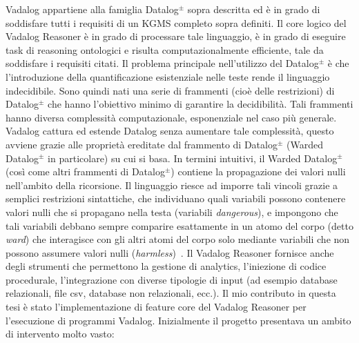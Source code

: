 Vadalog appartiene alla famiglia Datalog$^\pm$ sopra descritta ed è in grado di soddisfare tutti i requisiti di un KGMS completo sopra definiti. \newline
Il core logico del Vadalog Reasoner è in grado di processare tale linguaggio, è in grado di eseguire task di reasoning ontologici e risulta computazionalmente efficiente, tale da soddisfare i requisiti citati. \newline
Il problema principale nell'utilizzo del Datalog$^\pm$ è che l'introduzione della quantificazione esistenziale nelle teste rende il linguaggio indecidibile. Sono quindi nati una serie di frammenti (cioè delle restrizioni) di Datalog$^\pm$ che hanno l'obiettivo minimo di garantire la decidibilità. Tali frammenti hanno diversa complessità computazionale, esponenziale nel caso più generale. \newline
Vadalog cattura ed estende Datalog senza aumentare tale complessità, questo avviene grazie alle proprietà ereditate dal frammento di Datalog$^\pm$ (Warded Datalog$^\pm$ in particolare) su cui si basa. In termini intuitivi, il Warded Datalog$^\pm$ (così come altri frammenti di Datalog$^\pm$) contiene la propagazione dei valori nulli nell'ambito della ricorsione. Il linguaggio riesce ad imporre tali vincoli grazie a semplici restrizioni sintattiche, che individuano quali variabili possono contenere valori nulli che si propagano nella testa (variabili \emph{dangerous}), e impongono che tali variabili debbano sempre comparire esattamente in un atomo del corpo (detto \emph{ward}) che interagisce con gli altri atomi del corpo solo mediante variabili che non possono assumere valori nulli (\emph{harmless})~\cite{bellomarini2017swift}. \newline
Il Vadalog Reasoner fornisce anche degli strumenti che permettono la gestione di analytics, l'iniezione di codice procedurale, l'integrazione con diverse tipologie di input (ad esempio database relazionali, file csv, database non relazionali, ecc.).\newline \newline
Il mio contributo in questa tesi è stato l'implementazione di feature core del Vadalog Reasoner per l'esecuzione di programmi Vadalog. Inizialmente il progetto presentava un ambito di intervento molto vasto: 
